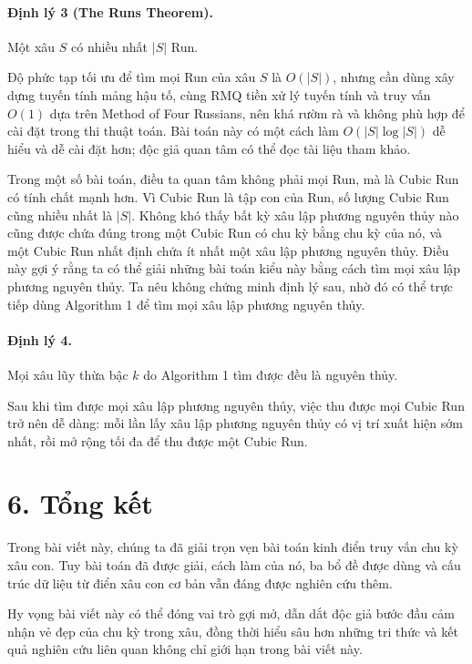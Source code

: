 \documentclass[11pt]{article}
\begin{document}
\paragraph{Định lý 3 (The Runs Theorem).}
Một xâu \(S\) có nhiều nhất \(|S|\) Run.

Độ phức tạp tối ưu để tìm mọi Run của xâu \(S\) là \(O(|S|)\), nhưng cần dùng
xây dựng tuyến tính mảng hậu tố, cùng RMQ tiền xử lý tuyến tính và truy vấn
\(O(1)\) dựa trên Method of Four Russians, nên khá rườm rà và không phù hợp
để cài đặt trong thi thuật toán. Bài toán này có một cách làm
\(O(|S|\log |S|)\) dễ hiểu và dễ cài đặt hơn; độc giả quan tâm có thể đọc tài
liệu tham khảo.

Trong một số bài toán, điều ta quan tâm không phải mọi Run, mà là Cubic Run có
tính chất mạnh hơn. Vì Cubic Run là tập con của Run, số lượng Cubic Run cũng
nhiều nhất là \(|S|\). Không khó thấy bất kỳ xâu lập phương nguyên thủy nào
cũng được chứa đúng trong một Cubic Run có chu kỳ bằng chu kỳ của nó, và một
Cubic Run nhất định chứa ít nhất một xâu lập phương nguyên thủy. Điều này gợi
ý rằng ta có thể giải những bài toán kiểu này bằng cách tìm mọi xâu lập phương
nguyên thủy. Ta nêu không chứng minh định lý sau, nhờ đó có thể trực tiếp dùng
Algorithm 1 để tìm mọi xâu lập phương nguyên thủy.

\paragraph{Định lý 4.}
Mọi xâu lũy thừa bậc \(k\) do Algorithm 1 tìm được đều là nguyên thủy.

Sau khi tìm được mọi xâu lập phương nguyên thủy, việc thu được mọi Cubic Run
trở nên dễ dàng: mỗi lần lấy xâu lập phương nguyên thủy có vị trí xuất hiện
sớm nhất, rồi mở rộng tối đa để thu được một Cubic Run.

\section*{6. Tổng kết}

Trong bài viết này, chúng ta đã giải trọn vẹn bài toán kinh điển truy vấn chu
kỳ xâu con. Tuy bài toán đã được giải, cách làm của nó, ba bổ đề được dùng và
cấu trúc dữ liệu từ điển xâu con cơ bản vẫn đáng được nghiên cứu thêm.

Hy vọng bài viết này có thể đóng vai trò gợi mở, dẫn dắt độc giả bước đầu cảm
nhận vẻ đẹp của chu kỳ trong xâu, đồng thời hiểu sâu hơn những tri thức và kết
quả nghiên cứu liên quan không chỉ giới hạn trong bài viết này.
\end{document}
